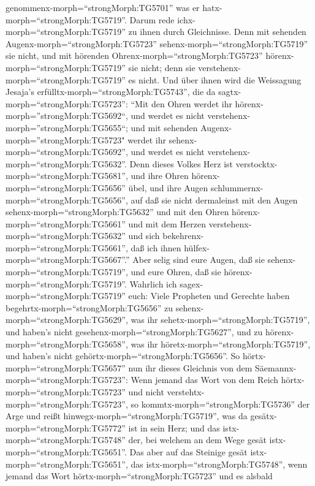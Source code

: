 genommenx-morph=``strongMorph:TG5701'' was er
hatx-morph=``strongMorph:TG5719''.  Darum rede
ichx-morph=``strongMorph:TG5719'' zu ihnen durch Gleichnisse. Denn mit
sehenden Augenx-morph=``strongMorph:TG5723''
sehenx-morph=``strongMorph:TG5719'' sie nicht, und mit hörenden
Ohrenx-morph=``strongMorph:TG5723'' hörenx-morph=``strongMorph:TG5719''
sie nicht; denn sie verstehenx-morph=``strongMorph:TG5719'' es nicht.
 Und über ihnen wird die Weissagung Jesaja's
erfülltx-morph=``strongMorph:TG5743'', die da
sagtx-morph=``strongMorph:TG5723'': ``Mit den Ohren werdet ihr
hörenx-morph=''strongMorph:TG5692``, und werdet es nicht
verstehenx-morph=''strongMorph:TG5655``; und mit sehenden
Augenx-morph=''strongMorph:TG5723" werdet ihr
sehenx-morph=``strongMorph:TG5692'', und werdet es nicht
verstehenx-morph=``strongMorph:TG5632''.  Denn dieses
Volkes Herz ist verstocktx-morph=``strongMorph:TG5681'', und ihre Ohren
hörenx-morph=``strongMorph:TG5656'' übel, und ihre Augen
schlummernx-morph=``strongMorph:TG5656'', auf daß sie nicht dermaleinst
mit den Augen sehenx-morph=``strongMorph:TG5632'' und mit den Ohren
hörenx-morph=``strongMorph:TG5661'' und mit dem Herzen
verstehenx-morph=``strongMorph:TG5632'' und sich
bekehrenx-morph=``strongMorph:TG5661'', daß ich ihnen
hülfex-morph=``strongMorph:TG5667''.''  Aber selig sind
eure Augen, daß sie sehenx-morph=``strongMorph:TG5719'', und eure Ohren,
daß sie hörenx-morph=``strongMorph:TG5719''.  Wahrlich ich
sagex-morph=``strongMorph:TG5719'' euch: Viele Propheten und Gerechte
haben begehrtx-morph=``strongMorph:TG5656'' zu
sehenx-morph=``strongMorph:TG5629'', was ihr
sehetx-morph=``strongMorph:TG5719'', und haben's nicht
gesehenx-morph=``strongMorph:TG5627'', und zu
hörenx-morph=``strongMorph:TG5658'', was ihr
höretx-morph=``strongMorph:TG5719'', und haben's nicht
gehörtx-morph=``strongMorph:TG5656''.  So
hörtx-morph=``strongMorph:TG5657'' nun ihr dieses Gleichnis von dem
Säemannx-morph=``strongMorph:TG5723'':  Wenn jemand das
Wort von dem Reich hörtx-morph=``strongMorph:TG5723'' und nicht
verstehtx-morph=``strongMorph:TG5723'', so
kommtx-morph=``strongMorph:TG5736'' der Arge und reißt
hinwegx-morph=``strongMorph:TG5719'', was da
gesätx-morph=``strongMorph:TG5772'' ist in sein Herz; und das
istx-morph=``strongMorph:TG5748'' der, bei welchem an dem Wege gesät
istx-morph=``strongMorph:TG5651''.  Das aber auf das
Steinige gesät istx-morph=``strongMorph:TG5651'', das
istx-morph=``strongMorph:TG5748'', wenn jemand das Wort
hörtx-morph=``strongMorph:TG5723'' und es alsbald
